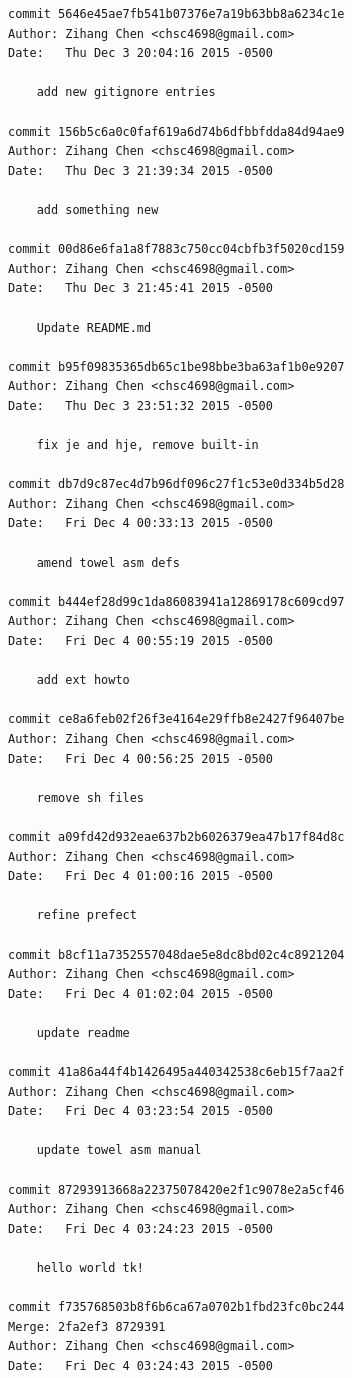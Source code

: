 \documentclass{report}
\begin{document}
\begin{appendices}
\begin{verbatim}
commit 5646e45ae7fb541b07376e7a19b63bb8a6234c1e
Author: Zihang Chen <chsc4698@gmail.com>
Date:   Thu Dec 3 20:04:16 2015 -0500

    add new gitignore entries

commit 156b5c6a0c0faf619a6d74b6dfbbfdda84d94ae9
Author: Zihang Chen <chsc4698@gmail.com>
Date:   Thu Dec 3 21:39:34 2015 -0500

    add something new

commit 00d86e6fa1a8f7883c750cc04cbfb3f5020cd159
Author: Zihang Chen <chsc4698@gmail.com>
Date:   Thu Dec 3 21:45:41 2015 -0500

    Update README.md

commit b95f09835365db65c1be98bbe3ba63af1b0e9207
Author: Zihang Chen <chsc4698@gmail.com>
Date:   Thu Dec 3 23:51:32 2015 -0500

    fix je and hje, remove built-in

commit db7d9c87ec4d7b96df096c27f1c53e0d334b5d28
Author: Zihang Chen <chsc4698@gmail.com>
Date:   Fri Dec 4 00:33:13 2015 -0500

    amend towel asm defs

commit b444ef28d99c1da86083941a12869178c609cd97
Author: Zihang Chen <chsc4698@gmail.com>
Date:   Fri Dec 4 00:55:19 2015 -0500

    add ext howto

commit ce8a6feb02f26f3e4164e29ffb8e2427f96407be
Author: Zihang Chen <chsc4698@gmail.com>
Date:   Fri Dec 4 00:56:25 2015 -0500

    remove sh files

commit a09fd42d932eae637b2b6026379ea47b17f84d8c
Author: Zihang Chen <chsc4698@gmail.com>
Date:   Fri Dec 4 01:00:16 2015 -0500

    refine prefect

commit b8cf11a7352557048dae5e8dc8bd02c4c8921204
Author: Zihang Chen <chsc4698@gmail.com>
Date:   Fri Dec 4 01:02:04 2015 -0500

    update readme

commit 41a86a44f4b1426495a440342538c6eb15f7aa2f
Author: Zihang Chen <chsc4698@gmail.com>
Date:   Fri Dec 4 03:23:54 2015 -0500

    update towel asm manual

commit 87293913668a22375078420e2f1c9078e2a5cf46
Author: Zihang Chen <chsc4698@gmail.com>
Date:   Fri Dec 4 03:24:23 2015 -0500

    hello world tk!

commit f735768503b8f6b6ca67a0702b1fbd23fc0bc244
Merge: 2fa2ef3 8729391
Author: Zihang Chen <chsc4698@gmail.com>
Date:   Fri Dec 4 03:24:43 2015 -0500


\end{verbatim}
\end{appendices}
\end{document}
